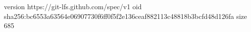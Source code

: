 version https://git-lfs.github.com/spec/v1
oid sha256:bc6553a63564e06907730f6ff0f5f2e136ceaf882113c48818b3bcfd48d126fa
size 685
